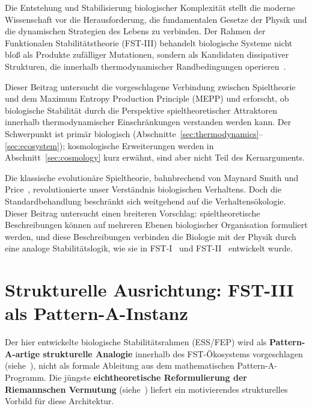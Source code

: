 \documentclass[12pt,a4paper]{article}
\theoremstyle{remark}
\begin{document}
Die Entstehung und Stabilisierung biologischer Komplexität stellt die moderne Wissenschaft vor die Herausforderung, die fundamentalen Gesetze der Physik und die dynamischen Strategien des Lebens zu verbinden. Der Rahmen der Funktionalen Stabilitätstheorie (FST-III) behandelt biologische Systeme nicht bloß als Produkte zufälliger Mutationen, sondern als Kandidaten dissipativer Strukturen, die innerhalb thermodynamischer Randbedingungen operieren~\citep{EcosystemMEPP}.

Dieser Beitrag untersucht die vorgeschlagene Verbindung zwischen Spieltheorie und dem Maximum Entropy Production Principle (MEPP) und erforscht, ob biologische Stabilität durch die Perspektive spieltheoretischer Attraktoren innerhalb thermodynamischer Einschränkungen verstanden werden kann. Der Schwerpunkt ist primär biologisch (Abschnitte~\ref{sec:thermodynamics}--\ref{sec:ecosystem}); kosmologische Erweiterungen werden in Abschnitt~\ref{sec:cosmology} kurz erwähnt, sind aber nicht Teil des Kernarguments.

Die klassische evolutionäre Spieltheorie, bahnbrechend von Maynard Smith und Price~\citep{MaynardSmithPrice1973,MaynardSmith1982}, revolutionierte unser Verständnis biologischen Verhaltens. Doch die Standardbehandlung beschränkt sich weitgehend auf die Verhaltensökologie. Dieser Beitrag untersucht einen breiteren Vorschlag: spieltheoretische Beschreibungen können auf mehreren Ebenen biologischer Organisation formuliert werden, und diese Beschreibungen verbinden die Biologie mit der Physik durch eine analoge Stabilitätslogik, wie sie in FST-I~\citep{FSTI} und FST-II~\citep{FSTII} entwickelt wurde.

\section{Strukturelle Ausrichtung: FST-III als Pattern-A-Instanz}
\label{sec:structural-alignment}

Der hier entwickelte biologische Stabilitätsrahmen (ESS/FEP) wird als \textbf{Pattern-A-artige strukturelle Analogie} innerhalb des FST-Ökosystems vorgeschlagen (siehe~\cite{FST-Unified2026}), nicht als formale Ableitung aus dem mathematischen Pattern-A-Programm. Die jüngste \textbf{eichtheoretische Reformulierung der Riemannschen Vermutung} (siehe~\cite{GeigerRH2026c}) liefert ein motivierendes strukturelles Vorbild für diese Architektur.
\end{document}
